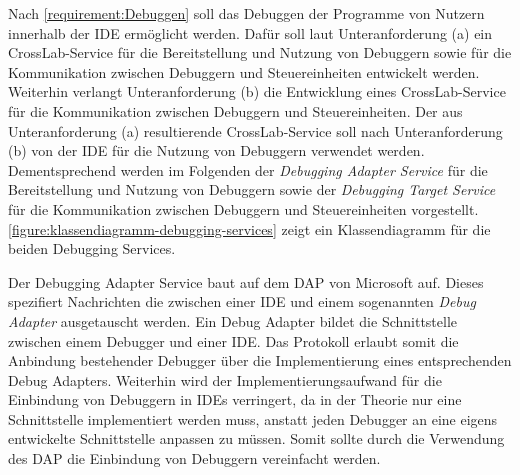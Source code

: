 Nach \autoref{requirement:Debuggen} soll das Debuggen der Programme von Nutzern innerhalb der IDE ermöglicht werden. Dafür soll laut Unteranforderung (a) ein CrossLab-Service für die Bereitstellung und Nutzung von Debuggern sowie für die Kommunikation zwischen Debuggern und Steuereinheiten entwickelt werden. Weiterhin verlangt Unteranforderung (b) die Entwicklung eines CrossLab-Service für die Kommunikation zwischen Debuggern und Steuereinheiten. Der aus Unteranforderung (a) resultierende CrossLab-Service soll nach Unteranforderung (b) von der IDE für die Nutzung von Debuggern verwendet werden. Dementsprechend werden im Folgenden der \textit{Debugging Adapter Service} für die Bereitstellung und Nutzung von Debuggern sowie der \textit{Debugging Target Service} für die Kommunikation zwischen Debuggern und Steuereinheiten vorgestellt. \autoref{figure:klassendiagramm-debugging-services} zeigt ein Klassendiagramm für die beiden Debugging Services.

Der Debugging Adapter Service baut auf dem \ac{DAP} \cite{noauthor_debug-adapter-protocol_nodate} von Microsoft auf. Dieses spezifiert Nachrichten die zwischen einer IDE und einem sogenannten \textit{Debug Adapter} ausgetauscht werden. Ein Debug Adapter bildet die Schnittstelle zwischen einem Debugger und einer IDE. Das Protokoll erlaubt somit die Anbindung bestehender Debugger über die Implementierung eines entsprechenden Debug Adapters. Weiterhin wird der Implementierungsaufwand für die Einbindung von Debuggern in IDEs verringert, da in der Theorie nur eine Schnittstelle implementiert werden muss, anstatt jeden Debugger an eine eigens entwickelte Schnittstelle anpassen zu müssen. Somit sollte durch die Verwendung des \ac{DAP} die Einbindung von Debuggern vereinfacht werden.

